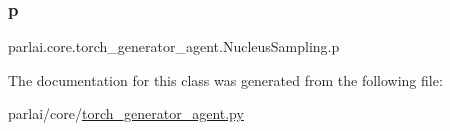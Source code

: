 \subsubsection{\texorpdfstring{p}{p}}
{\footnotesize\ttfamily parlai.\+core.\+torch\+\_\+generator\+\_\+agent.\+Nucleus\+Sampling.\+p}



The documentation for this class was generated from the following file\+:\begin{DoxyCompactItemize}
\item 
parlai/core/\hyperlink{torch__generator__agent_8py}{torch\+\_\+generator\+\_\+agent.\+py}\end{DoxyCompactItemize}
